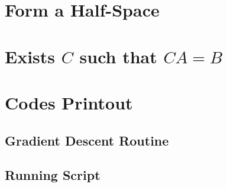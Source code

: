 \documentclass[11pt,a4paper]{article}
\begin{document}
\newpage
\setcounter{section}{6}
\section{Form a Half-Space}

\newpage
\setcounter{section}{7}
\section{Exists $C$ such that $CA = B$}

\newpage
\appendix
\section{Codes Printout}

\subsection{Gradient Descent Routine}

\newpage

\subsection{Running Script}


\end{document}
